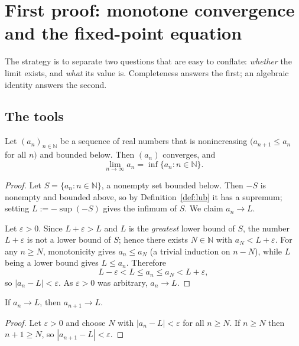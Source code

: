\documentclass{essay}
\begin{document}
\section{First proof: monotone convergence and the fixed-point equation}

The strategy is to separate two questions that are easy to conflate: \emph{whether}
the limit exists, and \emph{what} its value is. Completeness answers the first;
an algebraic identity answers the second.

\subsection{The tools}

\begin{lemma}\label{lem:mct}
Let $(a_{n})_{n \in \mathbb{N}}$ be a sequence of real numbers that is nonincreasing
$(a_{n+1} \leq a_{n}$ for all $n)$ and bounded below. Then $(a_{n})$ converges, and
\[
  \lim_{n \to \infty} a_{n} = \inf \{ a_{n} : n \in \mathbb{N} \}.
\]
\end{lemma}

\begin{proof}
Let $S = \{a_{n} : n \in \mathbb{N}\}$, a nonempty set bounded below. Then $-S$ is
nonempty and bounded above, so by Definition~\ref{def:lub} it has a supremum;
setting $L := -\sup(-S)$ gives the infimum of $S$. We claim $a_{n} \to L$.

Let $\varepsilon > 0$. Since $L + \varepsilon > L$ and $L$ is the \emph{greatest}
lower bound of $S$, the number $L + \varepsilon$ is not a lower bound of $S$; hence
there exists $N \in \mathbb{N}$ with $a_{N} < L + \varepsilon$. For any $n \geq N$,
monotonicity gives $a_{n} \leq a_{N}$ (a trivial induction on $n - N$), while $L$
being a lower bound gives $L \leq a_{n}$. Therefore
\[
  L - \varepsilon < L \leq a_{n} \leq a_{N} < L + \varepsilon,
\]
so $|a_{n} - L| < \varepsilon$. As $\varepsilon > 0$ was arbitrary, $a_{n} \to L$.
\end{proof}

\begin{lemma}\label{lem:shift}
If $a_{n} \to L$, then $a_{n+1} \to L$.
\end{lemma}

\begin{proof}
Let $\varepsilon > 0$ and choose $N$ with $|a_{n} - L| < \varepsilon$ for all
$n \geq N$. If $n \geq N$ then $n + 1 \geq N$, so $|a_{n+1} - L| < \varepsilon$.
\end{proof}
\end{document}
